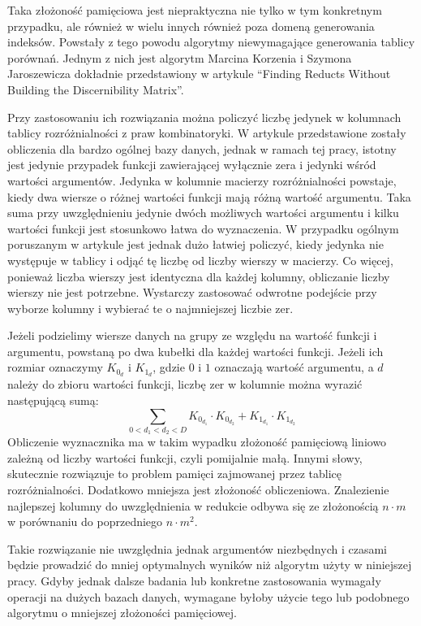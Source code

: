 Taka złożoność pamięciowa jest niepraktyczna nie tylko w tym konkretnym przypadku,
ale również w wielu innych również poza domeną generowania indeksów.
Powstały z tego powodu algorytmy niewymagające generowania tablicy porównań.
Jednym z nich jest algorytm Marcina Korzenia i Szymona Jaroszewicza dokładnie przedstawiony w artykule “Finding Reducts Without Building the Discernibility Matrix”.

Przy zastosowaniu ich rozwiązania można policzyć liczbę jedynek w kolumnach tablicy rozróżnialności z praw kombinatoryki.
W artykule przedstawione zostały obliczenia dla bardzo ogólnej bazy danych,
jednak w ramach tej pracy,
istotny jest jedynie przypadek funkcji zawierającej wyłącznie zera i jedynki wśród wartości argumentów.
Jedynka w kolumnie macierzy rozróżnialności powstaje,
kiedy dwa wiersze o różnej wartości funkcji mają różną wartość argumentu.
Taka suma przy uwzględnieniu jedynie dwóch możliwych wartości argumentu i kilku wartości funkcji jest stosunkowo łatwa do wyznaczenia.
W przypadku ogólnym poruszanym w artykule jest jednak dużo łatwiej policzyć,
kiedy jedynka nie występuje w tablicy i odjąć tę liczbę od liczby wierszy w macierzy.
Co więcej,
ponieważ liczba wierszy jest identyczna dla każdej kolumny,
obliczanie liczby wierszy nie jest potrzebne.
Wystarczy zastosować odwrotne podejście przy wyborze kolumny i wybierać te o najmniejszej liczbie zer.

Jeżeli podzielimy wiersze danych na grupy ze względu na wartość funkcji i argumentu,
powstaną po dwa kubełki dla każdej wartości funkcji.
Jeżeli ich rozmiar oznaczymy $K_{0_d}$ i $K_{1_d}$,
 gdzie $0$ i $1$ oznaczają wartość argumentu,
a $d$ należy do zbioru wartości funkcji,
liczbę zer w kolumnie można wyrazić następującą sumą:
\begin{equation}
\sum_{0<d_1<d_2<D} K_{0_{d_1}} \cdot K_{0_{d_2}} + K_{1_{d_1}} \cdot K_{1_{d_2}}
\end{equation}
Obliczenie wyznacznika ma w takim wypadku złożoność pamięciową liniowo zależną od liczby wartości funkcji,
czyli pomijalnie małą.
Innymi słowy, skutecznie rozwiązuje to problem pamięci zajmowanej przez tablicę rozróżnialności.
Dodatkowo mniejsza jest złożoność obliczeniowa.
Znalezienie najlepszej kolumny do uwzględnienia w redukcie odbywa się ze złożonością $n \cdot m$ w porównaniu do poprzedniego $n \cdot m^2$.

Takie rozwiązanie nie uwzględnia jednak argumentów niezbędnych i czasami będzie prowadzić do mniej optymalnych wyników niż algorytm użyty w niniejszej pracy.
Gdyby jednak dalsze badania lub konkretne zastosowania wymagały operacji na dużych bazach danych,
wymagane byłoby użycie tego lub podobnego algorytmu o mniejszej złożoności pamięciowej.

